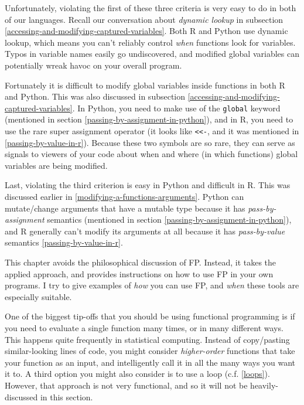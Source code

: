 \documentclass[
  12pt,
  krantz2]{krantz}
\begin{document}
Unfortunately, violating the first of these three criteria is very easy to do in both of our languages. Recall our conversation about \emph{dynamic lookup} in subsection \ref{accessing-and-modifying-captured-variables}. Both R and Python use dynamic lookup, which means you can't reliably control \emph{when} functions look for variables. Typos in variable names easily go undiscovered, and modified global variables can potentially wreak havoc on your overall program.

Fortunately it is difficult to modify global variables inside functions in both R and Python. This was also discussed in subsection \ref{accessing-and-modifying-captured-variables}. In Python, you need to make use of the \texttt{global} keyword (mentioned in section \ref{passing-by-assignment-in-python}), and in R, you need to use the rare super assignment operator (it looks like \texttt{\textless{}\textless{}-}, and it was mentioned in \ref{passing-by-value-in-r}). Because these two symbols are so rare, they can serve as signals to viewers of your code about when and where (in which functions) global variables are being modified.

Last, violating the third criterion is easy in Python and difficult in R. This was discussed earlier in \ref{modifying-a-functions-arguments}. Python can mutate/change arguments that have a mutable type because it has \emph{pass-by-assignment} semantics (mentioned in section \ref{passing-by-assignment-in-python}), and R generally can't modify its arguments at all because it has \emph{pass-by-value} semantics \ref{passing-by-value-in-r}.

This chapter avoids the philosophical discussion of FP. Instead, it takes the applied approach, and provides instructions on how to use FP in your own programs. I try to give examples of \emph{how} you can use FP, and \emph{when} these tools are especially suitable.

One of the biggest tip-offs that you should be using functional programming is if you need to evaluate a single function many times, or in many different ways. This happens quite frequently in statistical computing. Instead of copy/pasting similar-looking lines of code, you might consider \emph{higher-order} functions that take your function as an input, and intelligently call it in all the many ways you want it to. A third option you might also consider is to use a loop (c.f. \ref{loops}). However, that approach is not very functional, and so it will not be heavily-discussed in this section.
\end{document}
